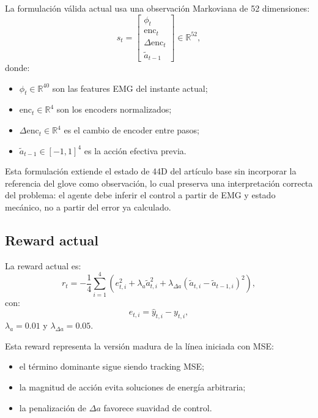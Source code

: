 \documentclass[11pt,a4paper]{article}
\begin{document}
La formulaci\'on v\'alida actual usa una observaci\'on Markoviana de 52 dimensiones:
\begin{equation}
s_t =
\begin{bmatrix}
\phi_t \\
\mathrm{enc}_t \\
\Delta \mathrm{enc}_t \\
\tilde{a}_{t-1}
\end{bmatrix}
\in \mathbb{R}^{52},
\end{equation}
donde:
\begin{itemize}[leftmargin=1.2cm]
    \item \(\phi_t \in \mathbb{R}^{40}\) son las features EMG del instante actual;
    \item \(\mathrm{enc}_t \in \mathbb{R}^{4}\) son los encoders normalizados;
    \item \(\Delta \mathrm{enc}_t \in \mathbb{R}^{4}\) es el cambio de encoder entre pasos;
    \item \(\tilde{a}_{t-1} \in [-1,1]^4\) es la acci\'on efectiva previa.
\end{itemize}

Esta formulaci\'on extiende el estado de 44D del art\'iculo base \citep{fuertes2026continuous} sin incorporar la referencia del glove como observaci\'on, lo cual preserva una interpretaci\'on correcta del problema: el agente debe inferir el control a partir de EMG y estado mec\'anico, no a partir del error ya calculado.

\subsection{Reward actual}

La reward actual es:
\begin{equation}
r_t =
-
\frac{1}{4}\sum_{i=1}^{4}
\left(
e_{t,i}^{2}
+
\lambda_a \tilde{a}_{t,i}^{2}
+
\lambda_{\Delta a}\left(\tilde{a}_{t,i} - \tilde{a}_{t-1,i}\right)^2
\right),
\label{eq:currentreward}
\end{equation}
con:
\begin{equation}
e_{t,i} = \hat{y}_{t,i} - y_{t,i},
\end{equation}
\(\lambda_a = 0.01\) y \(\lambda_{\Delta a} = 0.05\).

Esta reward representa la versi\'on madura de la l\'inea iniciada con MSE:
\begin{itemize}[leftmargin=1.2cm]
    \item el t\'ermino dominante sigue siendo tracking MSE;
    \item la magnitud de acci\'on evita soluciones de energ\'ia arbitraria;
    \item la penalizaci\'on de \(\Delta a\) favorece suavidad de control.
\end{itemize}
\end{document}

